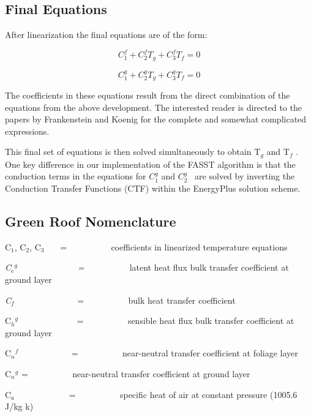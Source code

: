 \subsection{Final Equations}\label{final-equations}

After linearization the final equations are of the form:

\begin{equation}
C_1^f + C_2^f{T_g} + C_3^f{T_f} = 0
\end{equation}

\begin{equation}
C_1^g + C_2^g{T_g} + C_3^g{T_f} = 0
\end{equation}

The coefficients in these equations result from the direct combination of the equations from the above development. The interested reader is directed to the papers by Frankenstein and Koenig for the complete and somewhat complicated expressions.

This final set of equations is then solved simultaneously to obtain T\emph{\(_{g}\)} and T\emph{\(_{f}\)} . One key difference in our implementation of the FASST algorithm is that the conduction terms in the equations for \(C_1^g\) and \(C_2^g\) ~are solved by inverting the Conduction Transfer Functions (CTF) within the EnergyPlus solution scheme.

\subsection{Green Roof Nomenclature}\label{green-roof-nomenclature}

C\(_{1}\), C\(_{2}\), C\(_{3}\)~~~ = ~~~~~~~~~ coefficients in linearized temperature equations

\emph{C\(_{e}\)\(^{g}\)~~~~~~~~~~~~~ = ~~~~~~~~~} latent heat flux bulk transfer coefficient at ground layer

\emph{C\(_{f}\)~~ ~~~~~~~~~~~} = ~~~~~~~~~ bulk heat transfer coefficient

C\(_{h}\)\(^{g}\)~~~~~~~~~~~~~ = ~~~~~~~~~ sensible heat flux bulk transfer coefficient at ground layer

C\(_{n}\)\(^{f}\) ~~~~~~~~~~~ = ~~~~~~~~~ near-neutral transfer coefficient at foliage layer

C\(_{n}\)\(^{g}\) = ~~~~~~~~~ near-neutral transfer coefficient at ground layer

C\(_{a}\)~~~~~~~~~~~~ = ~~~~~~~~~ specific heat of air at constant pressure (1005.6 J/kg k)

